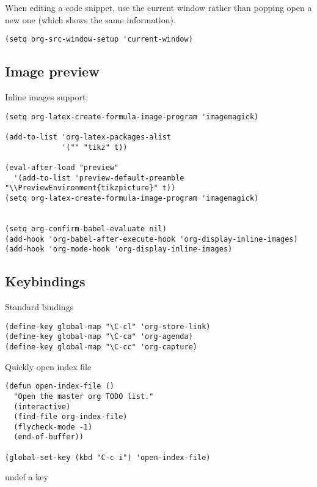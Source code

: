 \documentclass[12pt]{article}
\begin{document}
When editing a code snippet, use the current window rather than popping open a
new one (which shows the same information).
\begin{verbatim}
(setq org-src-window-setup 'current-window)
\end{verbatim}

\subsection{Image preview}
\label{sec:orgff170d2}

Inline images support:

\begin{verbatim}
(setq org-latex-create-formula-image-program 'imagemagick)

(add-to-list 'org-latex-packages-alist
             '("" "tikz" t))

(eval-after-load "preview"
  '(add-to-list 'preview-default-preamble "\\PreviewEnvironment{tikzpicture}" t))
(setq org-latex-create-formula-image-program 'imagemagick)


(setq org-confirm-babel-evaluate nil)
(add-hook 'org-babel-after-execute-hook 'org-display-inline-images)   
(add-hook 'org-mode-hook 'org-display-inline-images)
\end{verbatim}

\subsection{Keybindings}
\label{sec:orga45f1d2}


Standard bindings

\begin{verbatim}
(define-key global-map "\C-cl" 'org-store-link)
(define-key global-map "\C-ca" 'org-agenda)
(define-key global-map "\C-cc" 'org-capture)
\end{verbatim}

Quickly open index file
\begin{verbatim}
(defun open-index-file ()
  "Open the master org TODO list."
  (interactive)
  (find-file org-index-file)
  (flycheck-mode -1)
  (end-of-buffer))

(global-set-key (kbd "C-c i") 'open-index-file)
\end{verbatim}


undef a key
\end{document}
